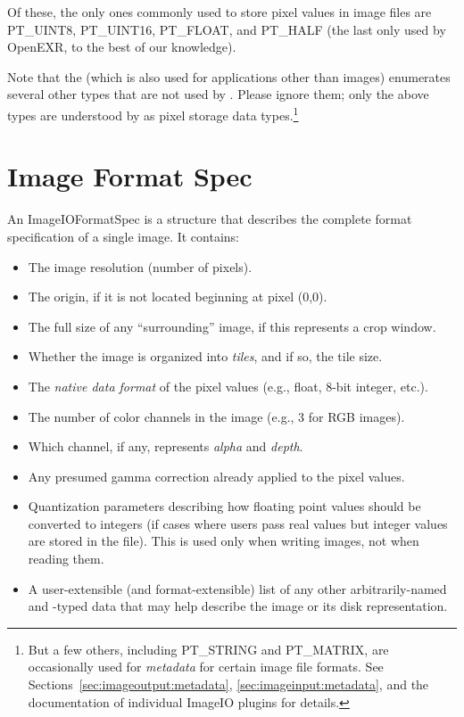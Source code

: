 Of these, the only ones commonly used to store pixel values in image files
are {\cf PT_UINT8}, {\cf PT_UINT16}, {\cf PT_FLOAT}, and {\cf PT_HALF}
(the last only used by OpenEXR, to the best of our knowledge).

Note that the \ParamBaseType (which is also used for applications other
than images) enumerates several other types that are not used by
\product.  Please ignore them; only the above types are understood by
\product as pixel storage data types.\footnote{But a few others, including
{\cf PT_STRING} and {\cf PT_MATRIX}, are occasionally used for
\emph{metadata} for certain image file formats. See
Sections~\ref{sec:imageoutput:metadata}, \ref{sec:imageinput:metadata},
and the documentation of individual ImageIO plugins for details.}

\section{Image Format Spec}

An {\kw ImageIOFormatSpec} is a structure that describes the complete
format specification of a single image.  It contains:

\begin{itemize}
\item The image resolution (number of pixels).
\item The origin, if it is not located beginning at pixel (0,0).
\item The full size of any ``surrounding'' image, if this represents a crop
  window.
\item Whether the image is organized into \emph{tiles}, and if so, the
  tile size.
\item The \emph{native data format} of the pixel values (e.g., float, 8-bit
  integer, etc.).
\item The number of color channels in the image (e.g., 3 for RGB
  images).
\item Which channel, if any, represents \emph{alpha} and \emph{depth}.
\item Any presumed gamma correction already applied to the pixel values.
\item Quantization parameters describing how floating point values
  should be converted to integers (if cases where users pass real values
  but integer values are stored in the file).  This is used only when
  writing images, not when reading them.
\item A user-extensible (and format-extensible) list of any other
  arbitrarily-named and -typed data that may help describe the image or
  its disk representation.
\end{itemize}

